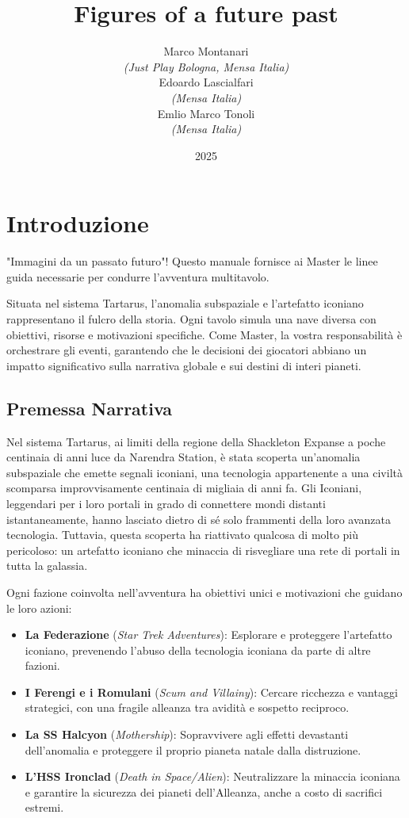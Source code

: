 \documentclass[letterpaper,twocolumn,openany,nodeprecatedcode]{dndbook}
\title{Figures of a future past}
\author{Marco Montanari\\
\textit{(Just Play Bologna, Mensa Italia)}\\
Edoardo Lascialfari\\
\textit{(Mensa Italia)}\\
Emlio Marco Tonoli\\
\textit{(Mensa Italia)}\\
\date{2025}
}
\begin{document}
\frontmatter

\maketitle

\tableofcontents

\mainmatter%

\chapter{Introduzione}

 "Immagini da un passato futuro"! Questo manuale fornisce ai Master le linee guida necessarie per condurre l’avventura multitavolo. 

Situata nel sistema Tartarus, l’anomalia subspaziale e l’artefatto iconiano rappresentano il fulcro della storia. Ogni tavolo simula una nave diversa con obiettivi, risorse e motivazioni specifiche. Come Master, la vostra responsabilità è orchestrare gli eventi, garantendo che le decisioni dei giocatori abbiano un impatto significativo sulla narrativa globale e sui destini di interi pianeti.

\section{Premessa Narrativa}

Nel sistema Tartarus, ai limiti della regione della Shackleton Expanse a poche centinaia di anni luce da Narendra Station, è stata scoperta un’anomalia subspaziale che emette segnali iconiani, una tecnologia appartenente a una civiltà scomparsa improvvisamente centinaia di migliaia di anni fa. Gli Iconiani, leggendari per i loro portali in grado di connettere mondi distanti istantaneamente, hanno lasciato dietro di sé solo frammenti della loro avanzata tecnologia. Tuttavia, questa scoperta ha riattivato qualcosa di molto più pericoloso: un artefatto iconiano che minaccia di risvegliare una rete di portali in tutta la galassia.

Ogni fazione coinvolta nell’avventura ha obiettivi unici e motivazioni che guidano le loro azioni:

\begin{itemize}
    \item \textbf{La Federazione} (\textit{Star Trek Adventures}): Esplorare e proteggere l'artefatto iconiano, prevenendo l’abuso della tecnologia iconiana da parte di altre fazioni.
    \item \textbf{I Ferengi e i Romulani} (\textit{Scum and Villainy}): Cercare ricchezza e vantaggi strategici, con una fragile alleanza tra avidità e sospetto reciproco.
    \item \textbf{La SS Halcyon} (\textit{Mothership}): Sopravvivere agli effetti devastanti dell’anomalia e proteggere il proprio pianeta natale dalla distruzione.
    \item \textbf{L’HSS Ironclad} (\textit{Death in Space/Alien}): Neutralizzare la minaccia iconiana e garantire la sicurezza dei pianeti dell’Alleanza, anche a costo di sacrifici estremi.
\end{itemize}
\end{document}
